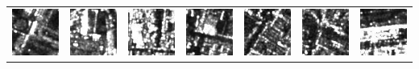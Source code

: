 \documentclass{article}
\begin{document}
\begin{table}[t]
	\centering
	\begin{tabular}{ccccccc}
			\includegraphics[scale=0.64]{Images/real_image_samples/1.png}  & 
			\includegraphics[scale=0.64]{Images/real_image_samples/2.png}  & 
			\includegraphics[scale=0.64]{Images/real_image_samples/3.png}  & 
			\includegraphics[scale=0.64]{Images/real_image_samples/4.png}  & 
			\includegraphics[scale=0.64]{Images/real_image_samples/5.png}  &
   			\includegraphics[scale=0.64]{Images/real_image_samples/6.png}  &
   			\includegraphics[scale=0.64]{Images/real_image_samples/7.png}  \\
   			

\end{tabular}
\end{table}
\end{document}
